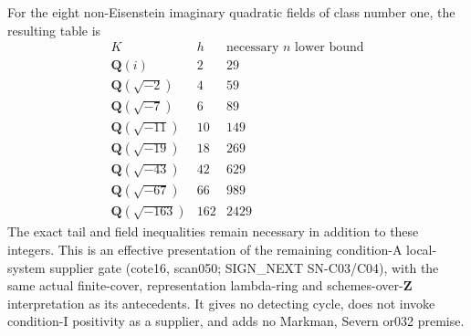 For the eight non-Eisenstein imaginary quadratic fields of class
number one, the resulting table is
\[
\begin{array}{c|r|r}
K&h&\text{necessary }n\text{ lower bound}\\\hline
\mathbf Q(i)&2&29\\
\mathbf Q(\sqrt{-2})&4&59\\
\mathbf Q(\sqrt{-7})&6&89\\
\mathbf Q(\sqrt{-11})&10&149\\
\mathbf Q(\sqrt{-19})&18&269\\
\mathbf Q(\sqrt{-43})&42&629\\
\mathbf Q(\sqrt{-67})&66&989\\
\mathbf Q(\sqrt{-163})&162&2429
\end{array}                                               \tag{ALT9.7}
\]
The exact tail and field inequalities remain necessary in addition
to these integers. This is an effective presentation of the remaining
condition-A local-system supplier gate (cote16, scan050;
SIGN_NEXT SN-C03/C04), with the same actual finite-cover,
representation lambda-ring and schemes-over-$\mathbf Z$ interpretation
as its antecedents. It gives no detecting cycle, does not invoke
condition-I positivity as a supplier, and adds no Markman, Severn
or032 premise.
